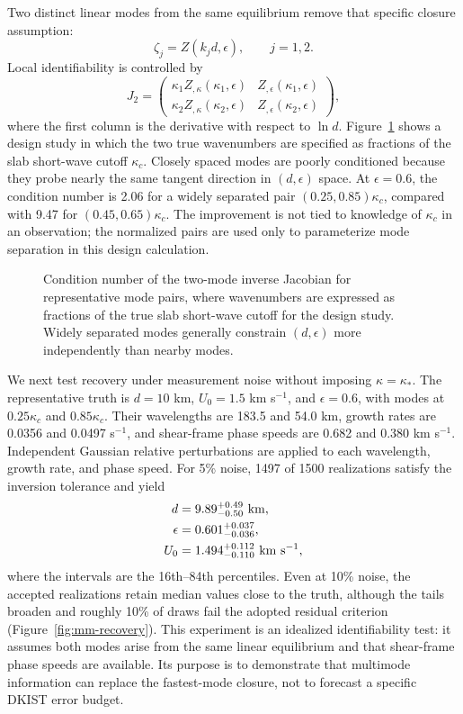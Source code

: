 \documentclass[linenumbers]{aastex7}
\begin{document}
Two distinct linear modes from the same equilibrium remove that specific closure assumption:
\begin{equation}
\zeta_j=Z(k_jd,\epsilon),\qquad j=1,2.
\end{equation}
Local identifiability is controlled by
\begin{equation}
J_2=
\begin{pmatrix}
\kappa_1 Z_{,\kappa}(\kappa_1,\epsilon) & Z_{,\epsilon}(\kappa_1,\epsilon)\\
\kappa_2 Z_{,\kappa}(\kappa_2,\epsilon) & Z_{,\epsilon}(\kappa_2,\epsilon)
\end{pmatrix},
\end{equation}
where the first column is the derivative with respect to $\ln d$. Figure~\ref{fig:mm-cond} shows a design study in which the two true wavenumbers are specified as fractions of the slab short-wave cutoff $\kappa_c$. Closely spaced modes are poorly conditioned because they probe nearly the same tangent direction in $(d,\epsilon)$ space. At $\epsilon=0.6$, the condition number is 2.06 for a widely separated pair $(0.25,0.85)\kappa_c$, compared with 9.47 for $(0.45,0.65)\kappa_c$. The improvement is not tied to knowledge of $\kappa_c$ in an observation; the normalized pairs are used only to parameterize mode separation in this design calculation.

\begin{figure}
\caption{Condition number of the two-mode inverse Jacobian for representative mode pairs, where wavenumbers are expressed as fractions of the true slab short-wave cutoff for the design study. Widely separated modes generally constrain $(d,\epsilon)$ more independently than nearby modes.}
\label{fig:mm-cond}
\end{figure}

We next test recovery under measurement noise without imposing $\kappa=\kappa_\ast$. The representative truth is $d=10$ km, $U_0=1.5$ km s$^{-1}$, and $\epsilon=0.6$, with modes at $0.25\kappa_c$ and $0.85\kappa_c$. Their wavelengths are 183.5 and 54.0 km, growth rates are 0.0356 and 0.0497 s$^{-1}$, and shear-frame phase speeds are 0.682 and 0.380 km s$^{-1}$. Independent Gaussian relative perturbations are applied to each wavelength, growth rate, and phase speed. For 5\% noise, 1497 of 1500 realizations satisfy the inversion tolerance and yield
\begin{align}
d&=9.89^{+0.49}_{-0.50}\ {\rm km},\\
\epsilon&=0.601^{+0.037}_{-0.036},\\
U_0&=1.494^{+0.112}_{-0.110}\ {\rm km\ s^{-1}},
\end{align}
where the intervals are the 16th--84th percentiles. Even at 10\% noise, the accepted realizations retain median values close to the truth, although the tails broaden and roughly 10\% of draws fail the adopted residual criterion (Figure~\ref{fig:mm-recovery}). This experiment is an idealized identifiability test: it assumes both modes arise from the same linear equilibrium and that shear-frame phase speeds are available. Its purpose is to demonstrate that multimode information can replace the fastest-mode closure, not to forecast a specific DKIST error budget.
\end{document}

